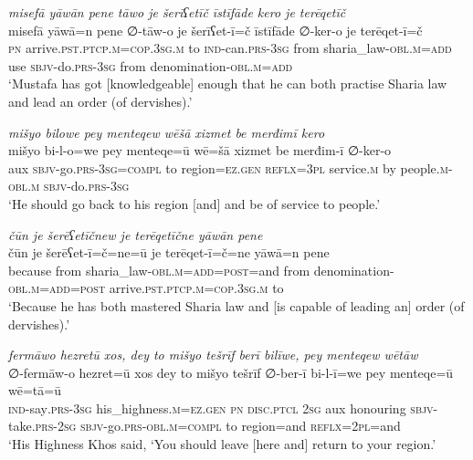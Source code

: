 \ea \label{ŽP.84}
\textit{misefā yāwān pene tāwo je šerīʕetīč īstīfāde kero je terēqetīč} \\ 
\gll misefā yāwā=n pene ∅-tāw-o je šerīʕet-ī=č īstīfāde ∅-ker-o je terēqet-ī=č \\ 
 \textsc{pn} arrive\textsc{.pst}\textsc{.ptcp}\textsc{.m}\textsc{=cop}\textsc{.3sg}\textsc{.m} to \textsc{ind-}can\textsc{.prs}\textsc{-3sg} from sharia\_law\textsc{-obl}\textsc{.m}\textsc{=add} use \textsc{sbjv-}do\textsc{.prs}\textsc{-3sg} from denomination\textsc{-obl}\textsc{.m}\textsc{=add} \\ 
\glt `Mustafa has got [knowledgeable] enough that he can both practise Sharia law and lead an order (of dervishes).'
\z 
 
\ea \label{ŽP.87}
\textit{mišyo bilowe pey menteqew wēšā xizmet be merđimī kero} \\ 
\gll mišyo bi-l-o=we pey menteqe=ū wē=šā xizmet be merđim-ī ∅-ker-o \\ 
 aux \textsc{sbjv-}go\textsc{.prs}\textsc{-3sg}\textsc{=compl} to region\textsc{\textsc{=ez.gen}} \textsc{reflx}\textsc{=3pl} service\textsc{.m} by people\textsc{.m}\textsc{-obl}\textsc{.m} \textsc{sbjv-}do\textsc{.prs}\textsc{-3sg} \\ 
\glt `He should go back to his region [and] and be of service to people.'
\z 
 
\ea \label{ŽP.88}
\textit{čūn je šerēʕetīčnew je terēqetīčne yāwān pene} \\ 
\gll čūn je šerēʕet-ī=č=ne=ū je terēqet-ī=č=ne yāwā=n pene \\ 
 because from sharia\_law\textsc{-obl}\textsc{.m}\textsc{=add}\textsc{=\textsc{post}}=and from denomination\textsc{-obl}\textsc{.m}\textsc{=add}\textsc{=\textsc{post}} arrive\textsc{.pst}\textsc{.ptcp}\textsc{.m}\textsc{=cop}\textsc{.3sg}\textsc{.m} to \\ 
\glt `Because he has both mastered Sharia law and [is capable of leading an] order (of dervishes).'
\z 
 
\ea \label{ŽP.91}
\textit{fermāwo hezretū xos, dey to mišyo tešrīf berī bilīwe, pey menteqew wētāw} \\ 
\gll ∅-fermāw-o hezret=ū xos dey to mišyo tešrīf ∅-ber-ī bi-l-ī=we pey menteqe=ū wē=tā=ū \\ 
 \textsc{ind-}say\textsc{.prs}\textsc{-3sg} his\_highness\textsc{.m}\textsc{\textsc{=ez.gen}} \textsc{pn} \textsc{disc.ptcl} \textsc{2sg} aux honouring \textsc{sbjv-}take\textsc{.prs}-\textsc{2sg} \textsc{sbjv-}go\textsc{.prs}\textsc{-obl}\textsc{.m}\textsc{=compl} to region=and \textsc{reflx}=\textsc{2pl}=and \\ 
\glt `His Highness Khos said, ‘You should leave [here and] return to your region.'
\z 
 
